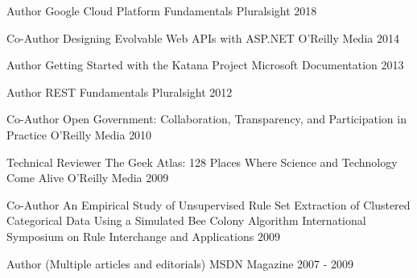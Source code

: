 


\begin{cventries}


\cventry
{Author}
{Google Cloud Platform Fundamentals}
{Pluralsight}
{2018}
{
}


\cventry
{Co-Author}
{Designing Evolvable Web APIs with ASP.NET}
{O'Reilly Media}
{2014}
{
}


\cventry
{Author}
{Getting Started with the Katana Project}
{Microsoft Documentation}
{2013}
{
}


\cventry
{Author}
{REST Fundamentals}
{Pluralsight}
{2012}
{
}


\cventry
{Co-Author}
{Open Government: Collaboration, Transparency, and Participation in Practice}
{O'Reilly Media}
{2010}
{
}


\cventry
{Technical Reviewer}
{The Geek Atlas: 128 Places Where Science and Technology Come Alive}
{O'Reilly Media}
{2009}
{
}


\cventry
{Co-Author}
{An Empirical Study of Unsupervised Rule Set Extraction of Clustered Categorical Data Using a Simulated Bee Colony Algorithm}
{International Symposium on Rule Interchange and Applications}
{2009}
{
}


\cventry
{Author}
{(Multiple articles and editorials)}
{MSDN Magazine}
{2007 - 2009}
{
}


\end{cventries}